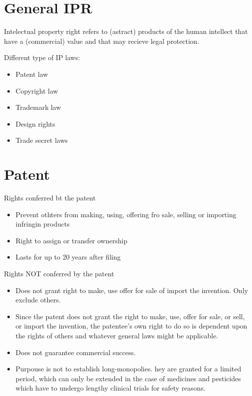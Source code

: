 \documentclass[12pt]{article} %
\begin{document}
\section{General IPR}


Intelectual property right refers to (astract) products of the human intellect that have a (commercial) value and that may recieve legal protection.


Different type of IP laws:

\begin{itemize}
   \item Patent law
   \item Copyright law
   \item Trademark law
   \item Design rights
   \item Trade secret laws 
\end{itemize}


\section{Patent}

Rights conferred bt the patent

\begin{itemize}
    \item Prevent othters from making, using, offering fro sale, selling or importing infringin products 
    \item Right to assign or transfer ownership
    \item Lasts for up to 20 years after filing
\end{itemize}


Rights NOT conferred by the patent

\begin{itemize}
    \item Does not grant right to make, use offer for sale of import the invention. Only exclude others.
    \item Since the patent does not grant the right to make, use, offer for sale, or sell, or import the invention, the patentee’s own right to do so is dependent upon the rights of others and whatever general laws might be applicable.
    \item Does not guarantee commercial success.
    \item Purpouse is not to establish long-monopolies. hey are granted for a limited period, which can only be extended in the case of medicines and pesticides which have to undergo lengthy clinical trials for safety reasons.
\end{itemize}
\end{document}
